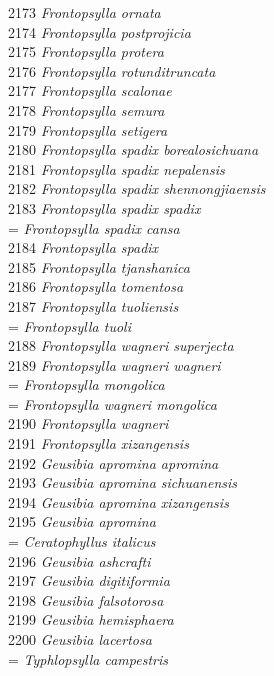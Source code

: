 \documentclass[
]{article}
\begin{document}
2173 \emph{Frontopsylla ornata}\\
2174 \emph{Frontopsylla postprojicia}\\
2175 \emph{Frontopsylla protera}\\
2176 \emph{Frontopsylla rotunditruncata}\\
2177 \emph{Frontopsylla scalonae}\\
2178 \emph{Frontopsylla semura}\\
2179 \emph{Frontopsylla setigera}\\
2180 \emph{Frontopsylla spadix borealosichuana}\\
2181 \emph{Frontopsylla spadix nepalensis}\\
2182 \emph{Frontopsylla spadix shennongjiaensis}\\
2183 \emph{Frontopsylla spadix spadix}\\
= \emph{Frontopsylla spadix cansa}\\
2184 \emph{Frontopsylla spadix}\\
2185 \emph{Frontopsylla tjanshanica}\\
2186 \emph{Frontopsylla tomentosa}\\
2187 \emph{Frontopsylla tuoliensis}\\
= \emph{Frontopsylla tuoli}\\
2188 \emph{Frontopsylla wagneri superjecta}\\
2189 \emph{Frontopsylla wagneri wagneri}\\
= \emph{Frontopsylla mongolica}\\
= \emph{Frontopsylla wagneri mongolica}\\
2190 \emph{Frontopsylla wagneri}\\
2191 \emph{Frontopsylla xizangensis}\\
2192 \emph{Geusibia apromina apromina}\\
2193 \emph{Geusibia apromina sichuanensis}\\
2194 \emph{Geusibia apromina xizangensis}\\
2195 \emph{Geusibia apromina}\\
= \emph{Ceratophyllus italicus}\\
2196 \emph{Geusibia ashcrafti}\\
2197 \emph{Geusibia digitiformia}\\
2198 \emph{Geusibia falsotorosa}\\
2199 \emph{Geusibia hemisphaera}\\
2200 \emph{Geusibia lacertosa}\\
= \emph{Typhlopsylla campestris}\\
\end{document}
